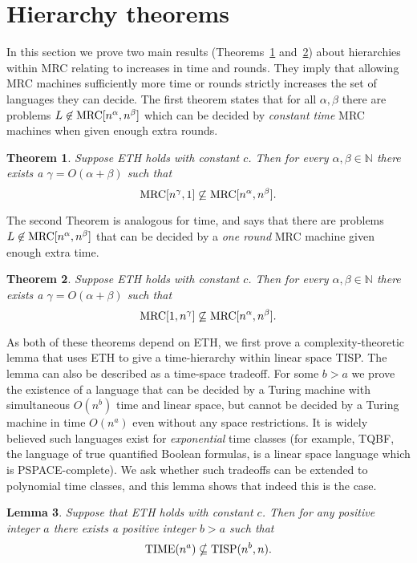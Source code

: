 \documentclass[11pt]{article}
\newtheorem{theorem}{Theorem}
\newtheorem{lemma}[theorem]{Lemma}
\theoremstyle{definition}
\theoremstyle{remark}
\newcommand{\mrc}{\textup{MRC}}
\newcommand{\TIME}{\textup{TIME}}
\newcommand{\TISP}{\textup{TISP}}
\begin{document}
\section{Hierarchy theorems}\label{sec:hierarchy}

In this section we prove two main results
(Theorems~\ref{thm:roundhierarchy} and~\ref{thm:timehierarchy}) about
hierarchies within MRC relating to increases in time and rounds.
They imply that allowing MRC machines sufficiently more time or rounds
strictly increases the set of languages they can decide.
The first
theorem states that for all $\alpha, \beta$ there are problems $L \not \in
\mrc[n^\alpha, n^\beta]$ which can be decided by \emph{constant time} MRC
machines when given enough extra rounds.

\begin{theorem} \label{thm:roundhierarchy}
Suppose ETH holds with constant $c$. Then for every $\alpha,\beta\in\mathbb N$
there exists a $\gamma = O(\alpha + \beta)$ such that $$\mrc[n^\gamma,1]
\not\subseteq \mrc[n^\alpha, n^\beta].$$
\end{theorem}

The second Theorem is analogous for time, and says that there are problems $L
\not \in \mrc[n^\alpha, n^\beta]$ that can be decided by a \emph{one round} MRC
machine given enough extra time.

\begin{theorem} \label{thm:timehierarchy}
Suppose ETH holds with constant $c$. Then for every $\alpha,\beta\in\mathbb N$
there exists a $\gamma = O(\alpha + \beta)$ such that $$\mrc[1, n^\gamma]
\not\subseteq \mrc[n^\alpha, n^\beta].$$
\end{theorem}

As both of these theorems depend on ETH, we first prove a complexity-theoretic
lemma that uses ETH to give a time-hierarchy within linear space TISP. The
lemma can also be described as a time-space tradeoff. For some $b > a$ we prove
the existence of a language that can be decided by a Turing machine with
simultaneous $O(n^b)$ time and linear space, but cannot be decided by a Turing
machine in time $O(n^a)$ even without any space restrictions. It is widely
believed such languages exist for \emph{exponential} time classes (for example,
TQBF, the language of true quantified Boolean formulas, is a linear space
language which is PSPACE-complete). We ask whether such tradeoffs can be
extended to polynomial time classes, and this lemma shows that indeed this is
the case.

\begin{lemma}\label{lemma:eth} Suppose that ETH holds with constant $c$. Then
for any positive integer $a$ there exists a positive integer $b>a$ such that
$$\TIME(n^a) \nsubseteq \TISP(n^b, n).$$ \end{lemma}
\end{document}
